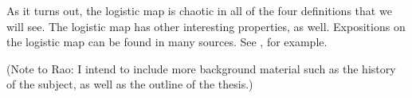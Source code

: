 \documentclass[10pt,twoside,draft]{book}
\begin{document}
As it turns out, the logistic map is chaotic in all of the four definitions that we will see.
The logistic map has other interesting properties, as well.
Expositions on the logistic map can be found in many sources.
See \citep{may1, may2, devaney}, for example.

(Note to Rao: I intend to include more background material such as the history of the subject, as well as the outline of the thesis.)

%
\end{document}
